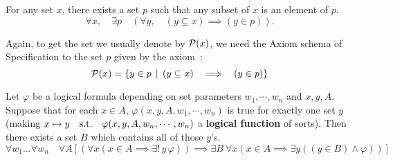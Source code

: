 \begin{axiom} \label{axiom-of-power-set}
    For any set $x$, there exists a set $p$ such that any subset of $x$ is an element of $p$.
    \[
        \forall x, \quad \exists p \quad (\forall y, \quad (y \subseteq x) \implies (y \in p)).    
    \]
\end{axiom}

\begin{remark}
    Again, to get the set we usually denote by $\operatorname{\mathcal P}(x)$, we need the Axiom schema of Specification to the set $p$ given by the axiom~:
    \[
        \operatorname{\mathcal P}(x) = \{ y \in p \, \mid \, (y \subseteq x) \quad \Longrightarrow \quad (y \in p) \}    
    \]
\end{remark}

\begin{axiom} \label{axiom-schema-of-replacement}
    Let $\varphi$ be a logical formula depending on set parameters $w_1,\cdots,w_n$ and $x,y,A$. Suppose that for each $x \in A$, $\varphi(x,y,A,w_1,\cdots,w_n)$ is true for exactly one set $y$ (making $x \mapsto y \quad \text{s.t.} \quad \varphi(x,y,A,w_n,\cdots,w_n)$ a \textbf{logical function} of sorts). Then there exists a set $B$ which contains all of those $y$'s. 
    \[
        \forall w_1 \ldots \forall w_n \quad \forall A \left[ (\forall x( x \in A \implies \exists ! \, y \, \varphi)) \implies \exists B\ \forall x \left( x \in A \implies \exists y( (y \in B) \land \varphi )  \right) \right]
    \]
\end{axiom}

